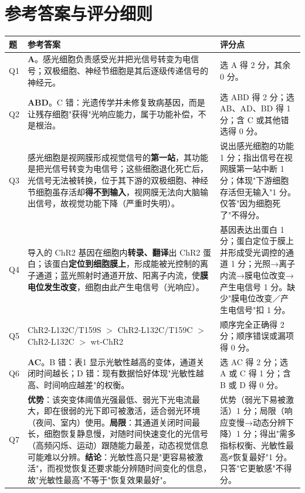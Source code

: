 \documentclass[UTF8,a4paper,11pt]{ctexart}
\begin{document}
\clearpage
\section*{参考答案与评分细则}

\begin{longtable}{@{}p{0.9cm}p{9.5cm}p{4.3cm}@{}}
\toprule
\textbf{题} & \textbf{参考答案} & \textbf{评分点} \\
\midrule
\endhead
Q1 & \textbf{A}。感光细胞负责感受光并把光信号转变为电信号；双极细胞、神经节细胞是其后逐级传递信号的神经元。 & 选 A 得 2 分，其余 0 分。 \\
\addlinespace
Q2 & \textbf{ABD}。C 错：光遗传学并未修复致病基因，而是让残存细胞"获得"光响应能力，属于功能补偿，不是根治。 & 选 ABD 得 2 分；选 AB、AD、BD 得 1 分；含 C 或其他错选得 0 分。 \\
\addlinespace
Q3 & 感光细胞是视网膜形成视觉信号的\textbf{第一站}，其功能是把光信号转变为电信号；这些细胞退化死亡后，光信号无法被转换，位于其下游的双极细胞、神经节细胞虽存活却\textbf{得不到输入}，视网膜无法向大脑输出信号，故视觉功能下降（严重时失明）。 & 说出感光细胞的功能 1 分；指出信号在视网膜第一站中断 1 分；体现"下游细胞存活但无输入"1 分。仅答"因为细胞死了"不得分。 \\
\addlinespace
Q4 & 导入的 ChR2 基因在细胞内\textbf{转录、翻译}出 ChR2 蛋白；该蛋白\textbf{定位到细胞膜上}，形成能被光控制的离子通道；蓝光照射时通道开放、阳离子内流，使\textbf{膜电位发生改变}，细胞由此产生电信号（光响应）。 & 基因表达出蛋白 1 分；蛋白定位于膜上并形成受光调控的通道 1 分；光照→离子内流→膜电位改变→产生电信号 1 分。缺少"膜电位改变／产生电信号"扣 1 分。 \\
\addlinespace
Q5 & ChR2-L132C/T159S $>$ ChR2-L132C/T159C $>$ ChR2-L132C $>$ wt-ChR2 & 顺序完全正确得 2 分；顺序错误或漏项得 0 分。 \\
\addlinespace
Q6 & \textbf{AC}。B 错：表1 显示光敏性越高的变体，通道关闭时间越长；D 错：现有数据恰好体现"光敏性越高、时间响应越差"的权衡。 & 选 AC 得 2 分；选 A 或 C 得 1 分；含 B 或 D 得 0 分。 \\
\addlinespace
Q7 & \textbf{优势}：该突变体阈值光强最低、弱光下光电流最大，即在很弱的光下即可被激活，适合弱光环境（夜间、室内）使用。\textbf{局限}：其通道关闭时间最长，细胞恢复静息慢，对随时间快速变化的光信号（高频闪烁、运动）跟随能力最差，动态视觉信息可能难以分辨。\textbf{结论}：光敏性高只是"更容易被激活"，而视觉恢复还要求能分辨随时间变化的信息，故"光敏性最高"不等于"恢复效果最好"。 & 优势（弱光下易被激活）1 分；局限（响应变慢→动态分辨下降）1 分；得出"需多指标权衡、光敏性最高≠恢复最好"1 分。只答"它更敏感"不得分。 \\

\end{longtable}
\end{document}
